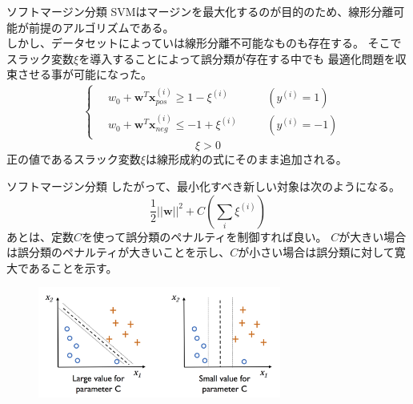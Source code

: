 \documentclass[aspectratio=169, dvipdfmx, 11pt]{beamer} %
\begin{document}
\begin{frame}{ソフトマージン分類}
    SVMはマージンを最大化するのが目的のため、線形分離可能が前提のアルゴリズムである。\\
    しかし、データセットによっていは線形分離不可能なものも存在する。
    そこでスラック変数\(\xi\)を導入することによって誤分類が存在する中でも
    最適化問題を収束させる事が可能になった。
    \begin{equation*}
        \begin{aligned}
            & \left\{ \,
                \begin{aligned}
                    & w_0 + \textbf{w}^T \textbf{x}_{pos}^{(i)} \geq  1 - \xi^{(i)} & \quad &(y^{(i)} = 1)\\
                    & w_0 + \textbf{w}^T \textbf{x}_{neg}^{(i)} \leq  -1 + \xi^{(i)} & \quad &(y^{(i)} = -1)
                \end{aligned}
            \right.
        \end{aligned}
    \end{equation*}
    \begin{equation*}
        \xi > 0
    \end{equation*}
    正の値であるスラック変数\(\xi\)は線形成約の式にそのまま追加される。
\end{frame}

\begin{frame}{ソフトマージン分類}
    したがって、最小化すべき新しい対象は次のようになる。
    \begin{equation*}
        \frac{1}{2}||\textbf{w}||^2 + C(\sum_{i}^{}\xi^{(i)})
    \end{equation*}
    あとは、定数\(C\)を使って誤分類のペナルティを制御すれば良い。
    \(C\)が大きい場合は誤分類のペナルティが大きいことを示し、\(C\)が小さい場合は誤分類に対して寛大であることを示す。
    \begin{figure}[b]
        \begin{center}
        \includegraphics[width=80mm]{img/day02/fig06.png}
        \end{center}
    \end{figure}
\end{frame}
\end{document}
